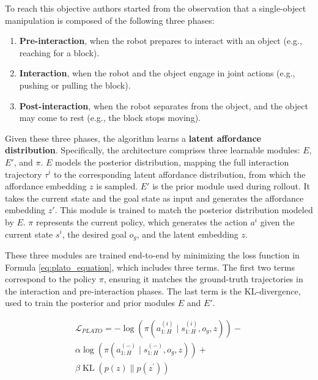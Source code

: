 To reach this objective authors started from the observation that a single-object manipulation is composed of the following three phases:
\begin{enumerate}
    \item \textbf{Pre-interaction}, when the robot prepares to interact with an object (e.g., reaching for a block).
    \item \textbf{Interaction}, when the robot and the object engage in joint actions (e.g., pushing or pulling the block).
    \item \textbf{Post-interaction}, when the robot separates from the object, and the object may come to rest (e.g., the block stops moving).
\end{enumerate}
Given these three phases, the algorithm learns a \textbf{latent affordance distribution}. Specifically, the architecture comprises three learnable modules:  $E$,  $E'$, and  $\pi$.  $E$ models the posterior distribution, mapping the full interaction trajectory  $\tau^{i}$ to the corresponding latent affordance distribution, from which the affordance embedding  $z$ is sampled.  $E'$ is the prior module used during rollout. It takes the current state and the goal state as input and generates the affordance embedding  $z'$. This module is trained to match the posterior distribution modeled by  $E$.  $\pi$ represents the current policy, which generates the action  $a^{i}$ given the current state  $s^{i}$, the desired goal  $o_g$, and the latent embedding  $z$.

These three modules are trained end-to-end by minimizing the loss function in Formula \ref{eq:plato_equation}, which includes three terms. The first two terms correspond to the policy  $\pi$, ensuring it matches the ground-truth trajectories in the interaction and pre-interaction phases. The last term is the KL-divergence, used to train the posterior and prior modules  $E$ and  $E'$.

\begin{equation}
    \label{eq:plato_equation}
    \begin{aligned}
        \mathcal{L}_{PLATO} = -\log \left(\pi\left(a_{1: H}^{(i)} \mid s_{1: H}^{(i)}, o_g, z\right)\right)- \\ 
        \alpha \log \left(\pi\left(a_{1: H}^{(-)} \mid s_{1: H}^{(-)}, o_g, z\right)\right)+ \\ 
        \beta \operatorname{KL}\left(p(z) \| p\left(z^{\prime}\right)\right)
    \end{aligned}
\end{equation}


